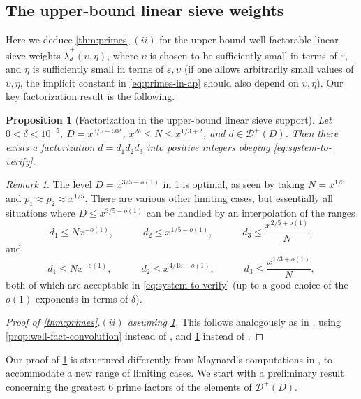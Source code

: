 \documentclass[reqno,11pt]{amsart}
\newtheorem{proposition}[theorem]{Proposition}
\theoremstyle{remark}
\newtheorem*{remark}{Remark}
\numberwithin{equation}{section}
\newcommand{\mD}{\mathcal{D}}
\newcommand{\eps}{\varepsilon}
\renewcommand{\tilde}{\widetilde}
\begin{document}
\subsection{The upper-bound linear sieve weights} \label{subsec:upper-bound-linear-sieve}

Here we deduce \cref{thm:primes}.$(ii)$ for the upper-bound well-factorable linear sieve weights $\tilde{\lambda}_{d}^+(\upsilon,\eta)$, where $\upsilon$ is chosen to be sufficiently small in terms of $\eps$, and $\eta$ is sufficiently small in terms of $\eps, \upsilon$ (if one allows arbitrarily small values of $\upsilon, \eta$, the implicit constant in \cref{eq:primes-in-ap} should also depend on $\upsilon, \eta$). Our key factorization result is the following.

\begin{proposition}[Factorization in the upper-bound linear sieve support] \label{prop:fact-upper-linear-sieve}
Let $0 < \delta < 10^{-5}$, $D = x^{3/5 - 50\delta}$, $x^{2\delta} \le N \le x^{1/3 + \delta}$, and $d \in \mD^+(D)$. Then there exists a factorization $d = d_1 d_2 d_3$ into positive integers obeying \cref{eq:system-to-verify}.
\end{proposition}

\begin{remark}
The level $D = x^{3/5-o(1)}$ in
\cref{prop:fact-upper-linear-sieve} is optimal, as seen by taking $N = x^{1/5}$ and $p_1 \approx p_2 \approx x^{1/5}$. There are various other limiting cases, but essentially all situations where $D \le x^{3/5-o(1)}$ can be handled by an interpolation of the ranges 
\[
    d_1 \le N x^{-o(1)}, \qquad\quad 
    d_2 \le x^{1/5 - o(1)}, \qquad\quad 
    d_3 \le \frac{x^{2/5 + o(1)}}{N},
\]
and
\[
    d_1 \le N x^{-o(1)}, \qquad\quad 
    d_2 \le x^{4/15 - o(1)}, \qquad\quad 
    d_3 \le \frac{x^{1/3 + o(1)}}{N},
\]
both of which are acceptable in \cref{eq:system-to-verify} (up to a good choice of the $o(1)$ exponents in terms of $\delta$).
\end{remark}


\begin{proof}[Proof of \cref{thm:primes}.$(ii)$ assuming \cref{prop:fact-upper-linear-sieve}]
This follows analogously as in \cite[Chapter 8]{maynard2025primes2}, using \cref{prop:well-fact-convolution} instead of \cite[Proposition 7.2]{maynard2025primes2}, and \cref{prop:fact-upper-linear-sieve} instead of  \cite[Proposition 8.1]{maynard2025primes2}.
\end{proof}

Our proof of \cref{prop:fact-upper-linear-sieve} is structured differently from Maynard's computations in \cite[Chapter 8]{maynard2025primes2}, to accommodate a new range of limiting cases. We start with a preliminary result concerning the greatest $6$ prime factors of the elements of $\mD^+(D)$.
\end{document}
